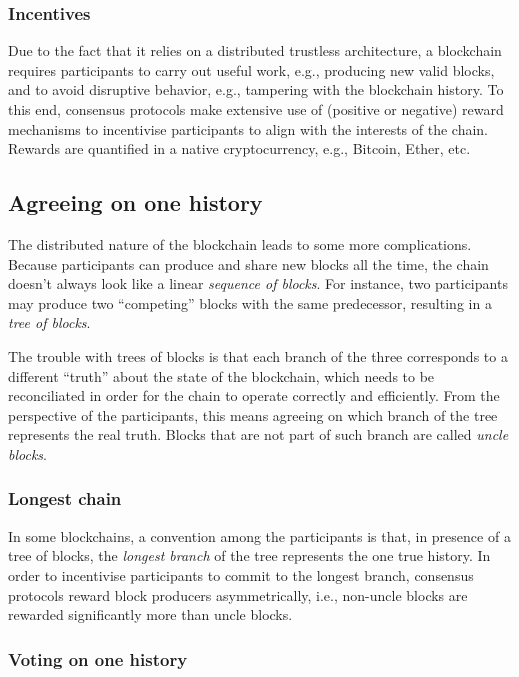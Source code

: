 \documentclass{article}
\begin{document}
\subsubsection{Incentives}

Due to the fact that it relies on a distributed trustless architecture, a
blockchain requires participants to carry out useful work, e.g., producing new
valid blocks, and to avoid disruptive behavior, e.g., tampering with the
blockchain history.  To this end, consensus protocols make extensive use of
(positive or negative) reward mechanisms to incentivise participants to align
with the interests of the chain. Rewards are quantified in a native
cryptocurrency, e.g., Bitcoin, Ether, etc.

\subsection{Agreeing on one history}

The distributed nature of the blockchain leads to some more complications.
Because participants can produce and share new blocks all the time, the chain
doesn't always look like a linear \emph{sequence of blocks}. For instance, two
participants may produce two ``competing'' blocks with the same predecessor,
resulting in a \emph{tree of blocks}.  

The trouble with trees of blocks is that each branch of the three corresponds
to a different ``truth'' about the state of the blockchain, which needs to be
reconciliated in order for the chain to operate correctly and efficiently.
From the perspective of the participants, this means agreeing on which branch
of the tree represents the real truth. Blocks that are not part of such branch
are called \emph{uncle blocks}. 

\subsubsection{Longest chain}

In some blockchains, a convention among the participants is that, in presence
of a tree of blocks, the \emph{longest branch} of the tree represents the one
true history. In order to incentivise participants to commit to the longest
branch, consensus protocols reward block producers asymmetrically, i.e.,
non-uncle blocks are rewarded significantly more than uncle blocks.

\subsubsection{Voting on one history}
\end{document}
